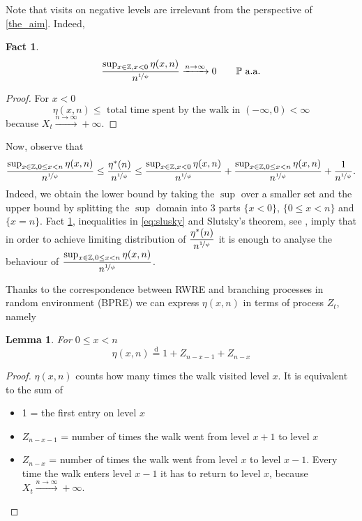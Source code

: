 \documentclass[12pt]{article}
\newcommand{\Pro}{\mathbb{P}}
\newcommand{\converges}{\xrightarrow{n \rightarrow \infty}}
\newtheorem{lemma}[theorem]{Lemma}
\newtheorem{fact}[theorem]{Fact}
\newcommand*{\distreq}{\stackrel{\text{d}}{=}}
\begin{document}
\bigskip

Note that visits on negative levels are irrelevant from the perspective of \eqref{the_aim}. Indeed, 
\begin{fact}\label{f:eta_negative}
\begin{equation} 
    \dfrac{ \sup_{x \in \mathbb{Z}, x < 0} \eta(x, n)  }{n^{\nicefrac{1}{\psi}}} \converges 0 \qquad \Pro \text{ a.a.}
\end{equation}
\end{fact}
\begin{proof}
    For $x < 0$ 
    \begin{equation*}
        \eta(x, n) \leq \text{ total time spent by the walk in } (-\infty, 0) < \infty 
    \end{equation*}
    because  $X_t \converges +\infty.$
\end{proof}

Now, observe that
\begin{equation}\label{eq:slusky}
     \dfrac{ \sup_{x \in \mathbb{Z}, 0\leq x < n} \eta(x, n)  }{n^{\nicefrac{1}{\psi}}} \leq  \dfrac{  \eta^*( n)  }{n^{\nicefrac{1}{\psi}}} \leq  \dfrac{ \sup_{x \in \mathbb{Z}, x < 0} \eta(x, n)  }{n^{\nicefrac{1}{\psi}}} +  \dfrac{ \sup_{x \in \mathbb{Z}, 0\leq x < n} \eta(x, n)  }{n^{\nicefrac{1}{\psi}}} + \dfrac{1}{n^{\nicefrac{1}{\psi}}}.
\end{equation}
Indeed, we obtain the lower bound by taking the $\sup$ over a smaller set and the upper bound by splitting the $\sup$ domain into 3 parts $\{x < 0 \}$, $\{ 0\leq x < n\}$ and $\{x = n\}$.  Fact \ref{f:eta_negative}, inequalities in \ref{eq:slusky} and Slutsky's theorem, see \cite{SLUTSKY}, imply that in order to achieve limiting distribution of $\dfrac{  \eta^*( n)  }{n^{\nicefrac{1}{\psi}}}$ it is enough to analyse the behaviour of  $\dfrac{ \sup_{x \in \mathbb{Z}, 0\leq x < n} \eta(x, n)  }{n^{\nicefrac{1}{\psi}}}$.

\bigskip

Thanks to the correspondence between RWRE and branching processes in random environment (BPRE) we can express $\eta(x, n)$ in terms of process $Z_t$, namely
\begin{lemma}\label{l:eta}
    For $ 0 \leq x  < n$ 
    \begin{equation}\label{e:eta_Z}
        \eta(x, n) \distreq 1 + Z_{n - x -1} + Z_{n-x}
    \end{equation}
\end{lemma}
\begin{proof}
$\eta(x, n)$ counts how many times the walk visited level $x$. It is equivalent to the sum of 
\begin{itemize}
    \item 1 = the first entry on level  $x$ 
    \item $Z_{n-x-1}$ = number of times the walk went from level  $x+1$  to level  $x$ 
    \item $Z_{n-x}$ =  number of times the walk went from level  $x$  to level  $x-1$.  Every time the walk enters level  $x-1$  it has to return to level $x$, because  $X_t \converges +\infty.$ 
\end{itemize}
\end{proof}
\end{document}
